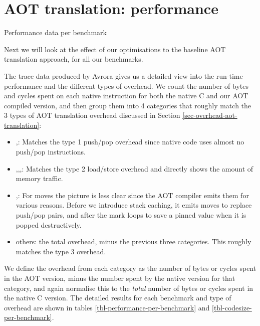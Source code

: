 \section{AOT translation: performance}
\label{sec-evaluation-aot-translation-performance}
\begin{table}[]
 \centering
 \caption{Performance data per benchmark}
 \label{tbl-performance-per-benchmark}
 \small
 \scriptsize
 \setlength{\tabcolsep}{4pt}
 
 \setlength{\tabcolsep}{6pt}
\end{table}

Next we will look at the effect of our optimisations to the baseline AOT translation approach, for all our benchmarks.

The trace data produced by Avrora gives us a detailed view into the run-time performance and the different types of overhead. We count the number of bytes and cycles spent on each native instruction for both the native C and our AOT compiled version, and then group them into 4 categories that roughly match the 3 types of AOT translation overhead discussed in Section \ref{sec-overhead-aot-translation}:
\begin{itemize}
	\item {},: Matches the type 1 push/pop overhead since native code uses almost no push/pop instructions.
	\item {},,,: Matches the type 2 load/store overhead and directly shows the amount of memory traffic.
	\item {},: For moves the picture is less clear since the AOT compiler emits them for various reasons. Before we introduce stack caching, it emits moves to replace push/pop pairs, and after the mark loops to save a pinned value when it is popped destructively.
	\item others: the total overhead, minus the previous three categories. This roughly matches the type 3 overhead.
\end{itemize}

We define the overhead from each category as the number of bytes or cycles spent in the AOT version, minus the number spent by the native version for that category, and again normalise this to the \emph{total} number of bytes or cycles spent in the native C version. The detailed results for each benchmark and type of overhead are shown in tables \ref{tbl-performance-per-benchmark} and \ref{tbl-codesize-per-benchmark}.

